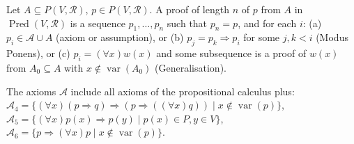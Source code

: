 Let $A \subseteq P(V, \mathcal{R})$, $p \in P(V, \mathcal{R})$. A proof of length $n$ of $p$ from $A$ in $\operatorname{Pred}(V, \mathcal{R})$ is a sequence $p_1, \ldots, p_n$ such that $p_n = p$, and for each $i$:
(a) $p_i \in \mathcal{A} \cup A$ (axiom or assumption), or
(b) $p_j = p_k \Rightarrow p_i$ for some $j, k < i$ (Modus Ponens), or
(c) $p_i = (\forall x)w(x)$ and some subsequence is a proof of $w(x)$ from $A_0 \subseteq A$ with $x \notin \operatorname{var}(A_0)$ (Generalisation).

The axioms $\mathcal{A}$ include all axioms of the propositional calculus plus:
$\mathcal{A}_4 = \{(\forall x)(p \Rightarrow q) \Rightarrow (p \Rightarrow ((\forall x)q)) \mid x \notin \operatorname{var}(p)\}$,
$\mathcal{A}_5 = \{(\forall x)p(x) \Rightarrow p(y) \mid p(x) \in P, y \in V\}$,
$\mathcal{A}_6 = \{p \Rightarrow (\forall x)p \mid x \notin \operatorname{var}(p)\}$.
